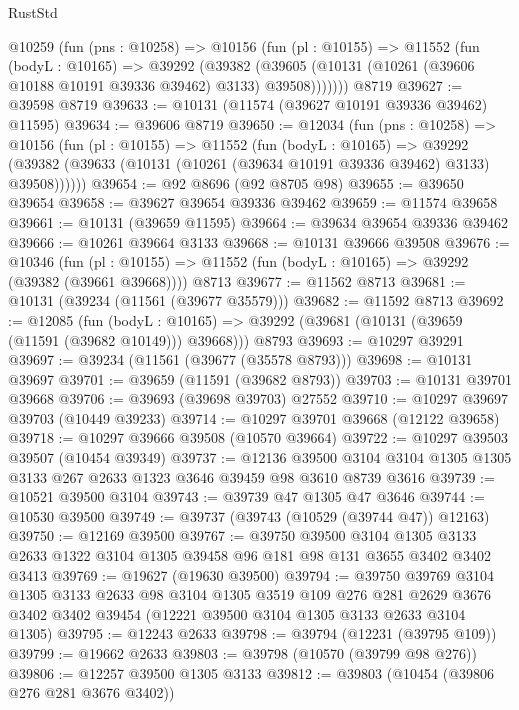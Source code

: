 \begin{lexlean}{RustStd}
\begin{coremodule}
    @10259
      (fun (pns : @10258) =>
      @10156
        (fun (pl : @10155) =>
        @11552
          (fun (bodyL : @10165) =>
          @39292
            (@39382
              (@39605 (@10131 (@10261 (@39606 @10188 @10191 @39336 @39462) @3133) @39508)))))))
    @8719
@39627 := @39598 @8719
@39633 := @10131 (@11574 (@39627 @10191 @39336 @39462) @11595)
@39634 := @39606 @8719
@39650 := @12034
    (fun (pns : @10258) =>
    @10156
      (fun (pl : @10155) =>
      @11552
        (fun (bodyL : @10165) =>
        @39292 (@39382 (@39633 (@10131 (@10261 (@39634 @10191 @39336 @39462) @3133) @39508))))))
@39654 := @92 @8696 (@92 @8705 @98)
@39655 := @39650 @39654
@39658 := @39627 @39654 @39336 @39462
@39659 := @11574 @39658
@39661 := @10131 (@39659 @11595)
@39664 := @39634 @39654 @39336 @39462
@39666 := @10261 @39664 @3133
@39668 := @10131 @39666 @39508
@39676 := @10346
    (fun (pl : @10155) => @11552 (fun (bodyL : @10165) => @39292 (@39382 (@39661 @39668))))
    @8713
@39677 := @11562 @8713
@39681 := @10131 (@39234 (@11561 (@39677 @35579)))
@39682 := @11592 @8713
@39692 := @12085
    (fun (bodyL : @10165) => @39292 (@39681 (@10131 (@39659 (@11591 (@39682 @10149))) @39668)))
    @8793
@39693 := @10297 @39291
@39697 := @39234 (@11561 (@39677 (@35578 @8793)))
@39698 := @10131 @39697
@39701 := @39659 (@11591 (@39682 @8793))
@39703 := @10131 @39701 @39668
@39706 := @39693 (@39698 @39703) @27552
@39710 := @10297 @39697 @39703 (@10449 @39233)
@39714 := @10297 @39701 @39668 (@12122 @39658)
@39718 := @10297 @39666 @39508 (@10570 @39664)
@39722 := @10297 @39503 @39507 (@10454 @39349)
@39737 := @12136
    @39500
    @3104
    @3104
    @1305
    @1305
    @3133
    @267
    @2633
    @1323
    @3646
    @39459
    @98
    @3610
    @8739
    @3616
@39739 := @10521 @39500 @3104
@39743 := @39739 @47 @1305 @47 @3646
@39744 := @10530 @39500
@39749 := @39737 (@39743 (@10529 (@39744 @47)) @12163)
@39750 := @12169 @39500
@39767 := @39750
    @39500
    @3104
    @1305
    @3133
    @2633
    @1322
    @3104
    @1305
    @39458
    @96
    @181
    @98
    @131
    @3655
    @3402
    @3402
    @3413
@39769 := @19627 (@19630 @39500)
@39794 := @39750
    @39769
    @3104
    @1305
    @3133
    @2633
    @98
    @3104
    @1305
    @3519
    @109
    @276
    @281
    @2629
    @3676
    @3402
    @3402
    @39454
    (@12221 @39500 @3104 @1305 @3133 @2633 @3104 @1305)
@39795 := @12243 @2633
@39798 := @39794 (@12231 (@39795 @109))
@39799 := @19662 @2633
@39803 := @39798 (@10570 (@39799 @98 @276))
@39806 := @12257 @39500 @1305 @3133
@39812 := @39803 (@10454 (@39806 @276 @281 @3676 @3402))

\end{coremodule}
\end{lexlean}
